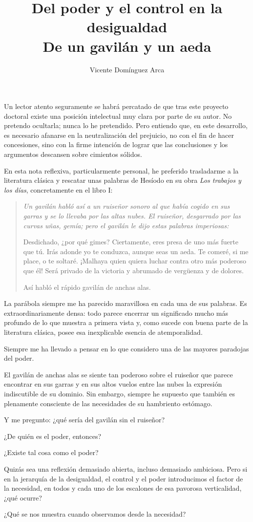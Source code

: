 \documentclass[12pt,a4paper]{article}
\title{
    \textbf{Del poder y el control en la desigualdad}\\[0.4em]
    \large De un gavilán y un aeda
}
\author{
    Vicente Domínguez Arca
}
\date{}
\begin{document}
\maketitle

\vspace{1em}

Un lector atento seguramente se habrá percatado de que
tras este proyecto doctoral existe una posición intelectual
muy clara por parte de su autor. No pretendo ocultarla;
nunca lo he pretendido. Pero entiendo que, en este
desarrollo, es necesario afanarse en la neutralización
del prejuicio, no con el fin de hacer concesiones, sino
con la firme intención de lograr que las conclusiones
y los argumentos descansen sobre cimientos sólidos.

En esta nota reflexiva, particularmente personal,
he preferido trasladarme a la literatura clásica
y rescatar unas palabras de Hesíodo en su obra
\textit{Los trabajos y los días}, concretamente
en el libro I:

\begin{quote}
\itshape
Un gavilán habló así a un ruiseñor sonoro al que
había cogido en sus garras y se lo llevaba por
las altas nubes. El ruiseñor, desgarrado por las
curvas uñas, gemía; pero el gavilán le dijo estas
palabras imperiosas:

\medskip

Desdichado, ¿por qué gimes? Ciertamente, eres
presa de uno más fuerte que tú. Irás adonde
yo te conduzca, aunque seas un aeda.
Te comeré, si me place, o te soltaré.
¡Malhaya quien quiera luchar contra otro
más poderoso que él! Será privado de la
victoria y abrumado de vergüenza y de dolores.

\medskip

Así habló el rápido gavilán de anchas alas.
\end{quote}

La parábola siempre me ha parecido maravillosa en cada una
de sus palabras. Es extraordinariamente densa:
todo parece encerrar un significado mucho más
profundo de lo que muestra a primera vista y,
como sucede con buena parte de la literatura
clásica, posee esa inexplicable esencia de
atemporalidad.

Siempre me ha llevado a pensar en lo que considero
una de las mayores paradojas del poder.

El gavilán de anchas alas se siente tan poderoso
sobre el ruiseñor que parece encontrar en sus
garras y en sus altos vuelos entre las nubes
la expresión indiscutible de su dominio.
Sin embargo, siempre he supuesto que también
es plenamente consciente de las necesidades
de su hambriento estómago.

Y me pregunto: ¿qué sería del gavilán sin
el ruiseñor?

¿De quién es el poder, entonces?

¿Existe tal cosa como el poder?

Quizás sea una reflexión demasiado abierta,
incluso demasiado ambiciosa. Pero si en la
jerarquía de la desigualdad, el control y el
poder introducimos el factor de la necesidad,
en todos y cada uno de los escalones de esa
pavorosa verticalidad, ¿qué ocurre?

¿Qué se nos muestra cuando observamos desde la necesidad?
\end{document}
